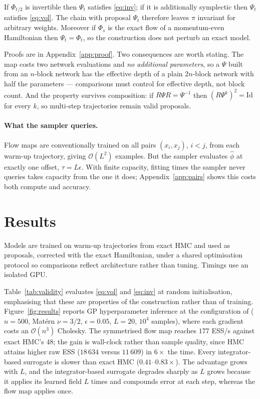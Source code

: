 \documentclass[mlabstract,onecolumn]{jmlr}
\newcommand{\flip}{R}
\begin{document}
\begin{proposition}
\label{prop:involution}
If $\Phi_{t/2}$ is invertible then $\Psi_t$ satisfies \eqref{eq:inv}; if it is
additionally symplectic then $\Psi_t$ satisfies \eqref{eq:vol}. The chain with
proposal $\Psi_t$ therefore leaves $\pi$ invariant for arbitrary weights.
Moreover if $\Phi_s$ is the exact flow of a momentum-even Hamiltonian then
$\Psi_t = \Phi_t$, so the construction does not perturb an exact model.
\end{proposition}

Proofs are in Appendix~\ref{app:proof}. Two consequences are worth stating. The map
costs two network evaluations and \emph{no additional parameters}, so a $\Psi$
built from an $n$-block network has the effective depth of a plain $2n$-block
network with half the parameters --- comparisons must control for effective
depth, not block count. And the property survives composition: if
$\flip \Psi \flip = \Psi^{-1}$ then $(\flip \Psi^{k})^2 = \mathrm{Id}$ for
every $k$, so multi-step trajectories remain valid proposals.

\paragraph{What the sampler queries.} Flow maps are conventionally trained on
all pairs $(x_i,x_j)$, $i<j$, from each warm-up trajectory, giving
$\mathcal{O}(L^2)$ examples. But the sampler evaluates $\hat\phi$ at exactly one
offset, $\tau = L\epsilon$. With finite capacity, fitting times the sampler
never queries takes capacity from the one it does; Appendix~\ref{app:pairs} shows this
costs both compute and accuracy.

\section{Results}

Models are trained on warm-up trajectories from exact HMC and used as proposals,
corrected with the exact Hamiltonian, under a shared optimisation protocol so
comparisons reflect architecture rather than tuning. Timings use an isolated GPU.

Table~\ref{tab:validity} evaluates \eqref{eq:vol} and \eqref{eq:inv} at random
initialisation, emphasising that these are properties of the construction rather
than of training. Figure~\ref{fig:results} reports GP hyperparameter inference at the
configuration of \citet{Li_2019} ($n=500$, Mat\'ern $\nu=3/2$, $\epsilon=0.05$,
$L=20$, $10^4$ samples), where each gradient costs an $\mathcal{O}(n^3)$
Cholesky. The symmetrised flow map reaches $177$ ESS/s against exact HMC's
$48$; the gain is wall-clock rather than sample quality, since HMC attains
higher raw ESS ($18\,634$ versus $11\,609$) in $6\times$ the time. Every
integrator-based surrogate is slower than exact HMC ($0.41$--$0.83\times$). The
advantage grows with $L$, and the integrator-based surrogate degrades sharply as
$L$ grows because it applies its learned field $L$ times and compounds error at
each step, whereas the flow map applies once.
\end{document}
